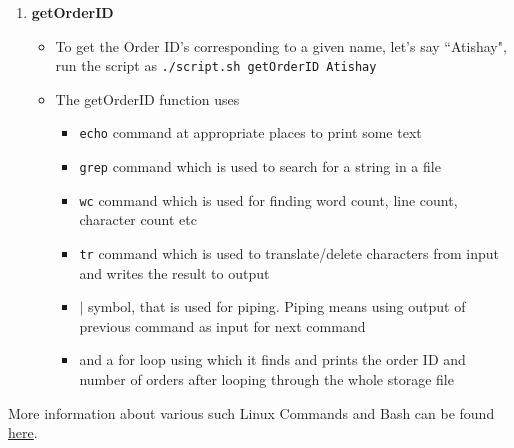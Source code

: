\documentclass[12pt]{article}
\begin{document}
\begin{enumerate}
\begin{itemize}
\begin{figure}[H]
\begin{floatrow}
            \end{floatrow}
        \end{figure}
    \end{itemize}
    \item \textbf{getOrderID}
    \begin{itemize}
        \item To get the Order ID's corresponding to a given name, let's say ``Atishay", run the script as \texttt{./script.sh getOrderID Atishay}
        \begin{figure}[H]
        \centering
            \begin{floatrow}
            \end{floatrow}
        \end{figure}
        \item The getOrderID function uses
        \begin{itemize}
            \item \texttt{echo} command at appropriate places to print some text
            \item \texttt{grep} command which is used to search for a string in a file
            \item \texttt{wc} command which is used for finding word count, line count, character count etc
            \item \texttt{tr}\cite{tr:6} command which is used to translate/delete characters from input and writes the result to output
            \item $|$ symbol, that is used for piping. Piping means using output of previous command as input for next command
            \item and a for loop using which it finds and prints the order ID and number of orders after looping through the whole storage file
        \end{itemize}
    \end{itemize}
\end{enumerate}
More information about various such Linux Commands and Bash can be found \href{https://www.javatpoint.com/linux-commands}{here}.

\newpage
\end{document}
